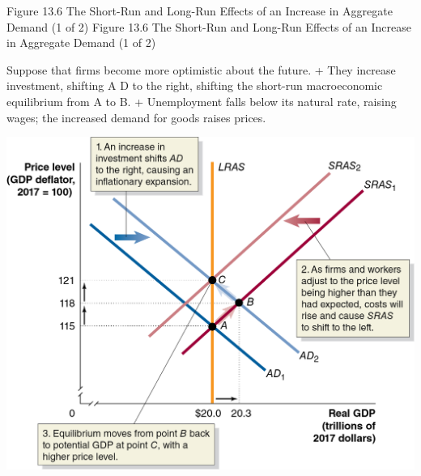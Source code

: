 \documentclass[
  12pt,
  ignorenonframetext,
]{beamer}
\begin{document}
\begin{frame}{Figure 13.6 The Short-Run and Long-Run Effects of an
Increase in Aggregate Demand (1 of 2)}
\protect\hypertarget{figure-13.6-the-short-run-and-long-run-effects-of-an-increase-in-aggregate-demand-1-of-2}{}
Figure 13.6 The Short-Run and Long-Run Effects of an Increase in
Aggregate Demand (1 of 2)

Suppose that firms become more optimistic about the future. + They
increase investment, shifting A D to the right, shifting the short-run
macroeconomic equilibrium from A to B. + Unemployment falls below its
natural rate, raising wages; the increased demand for goods raises
prices.

\includegraphics[width=\textwidth,height=0.99\textheight]{imgs3/img_slide35a.png}
\end{frame}
\end{document}

